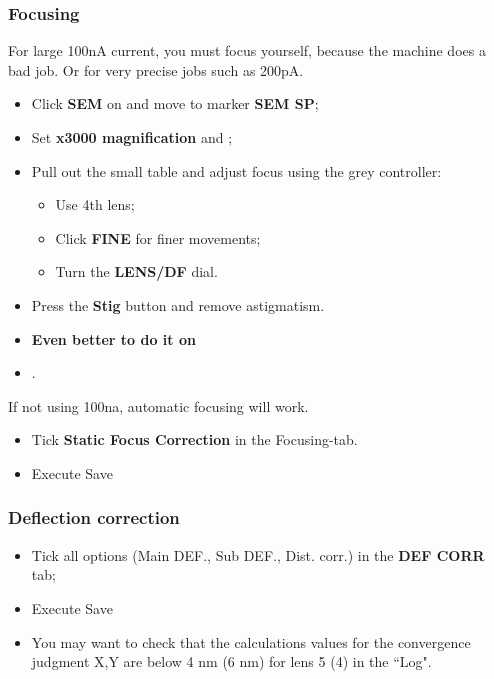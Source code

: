 \subsubsection{Focusing}
\label{sec:focusing}

\begin{framed}\noindent
  For large 100nA  current, you must focus yourself, because  the machine does a
  bad job. Or for very precise jobs such as 200pA.
\end{framed}
\begin{itemize}
\item Click \textbf{SEM} on and move to marker \textbf{SEM SP};
\item Set \textbf{x3000 magnification} and ;
\item Pull out the small table and adjust focus using the grey controller:
  \begin{itemize}
  \item Use 4th lens;
  \item Click \textbf{FINE} for finer movements;
  \item Turn the \textbf{LENS/DF} dial.
  \end{itemize}
\item Press the \textbf{Stig} button and remove astigmatism.
\item \textbf{Even better to do it on }
\item {}.
\end{itemize}

\begin{framed}\noindent
  If not using 100na, automatic focusing will work.
\end{framed}
\begin{itemize}
\item Tick \textbf{Static Focus Correction} in the Focusing-tab.
\item Execute \ira Save
\end{itemize}

\subsubsection{Deflection correction}

\begin{itemize}
\item Tick all  options (Main DEF., Sub DEF., Dist.   corr.)  in the \textbf{DEF
    CORR} tab;
\item Execute \ira Save
\item You  may want to  check that the  calculations values for  the convergence
  judgment X,Y are below 4 nm (6 nm) for lens 5 (4) in the ``Log".
\end{itemize}


